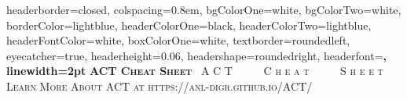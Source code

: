 \documentclass[potrait, z1paper, fontscale=0.33]{baposter} %
\begin{document}
\begin{poster}
{\begin{flushleft}
\begin{tabular}{@{}ll@{}}
\end{tabular}

\end{flushleft}

}

\end{poster}
\newpage


\begin{poster}
{
headerborder=closed, colspacing=0.8em, bgColorOne=white, bgColorTwo=white, borderColor=lightblue, headerColorOne=black, headerColorTwo=lightblue, 
headerFontColor=white, boxColorOne=white, textborder=roundedleft, eyecatcher=true, headerheight=0.06\textheight, headershape=roundedright, headerfont=\Large\bf\textsc, linewidth=2pt 
}
{\bf\textsc{ACT Cheat Sheet}\vspace{0.5em}} %
{\textsc{\ A C T \ \ \ \ \ C h e a t \ \ \ \ \ S h e e t\ \hspace{12pt}}}
{\textsc{Learn More About ACT at https://anl-digr.github.io/ACT/ \hspace{12pt}}}  



\end{poster}
\end{document}
